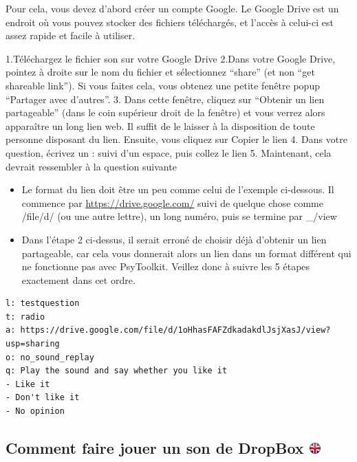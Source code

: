 \documentclass[
]{book}
\providecommand{\tightlist}{%
  \setlength{\itemsep}{0pt}\setlength{\parskip}{0pt}}
\begin{document}
Pour cela, vous devez d'abord créer un compte Google. Le Google Drive est un endroit où vous pouvez stocker des fichiers téléchargés, et l'accès à celui-ci est assez rapide et facile à utiliser.

1.Téléchargez le fichier son sur votre Google Drive
2.Dans votre Google Drive, pointez à droite sur le nom du fichier et sélectionnez ``share'' (et non ``get shareable link''). Si vous faites cela, vous obtenez une petite fenêtre popup ``Partager avec d'autres''.
3. Dans cette fenêtre, cliquez sur ``Obtenir un lien partageable'' (dans le coin supérieur droit de la fenêtre) et vous verrez alors apparaître un long lien web. Il suffit de le laisser à la disposition de toute personne disposant du lien. Ensuite, vous cliquez sur Copier le lien
4. Dans votre question, écrivez un : suivi d'un espace, puis collez le lien
5. Maintenant, cela devrait ressembler à la question suivante

\begin{itemize}
\tightlist
\item
  Le format du lien doit être un peu comme celui de l'exemple ci-dessous. Il commence par \url{https://drive.google.com/} suivi de quelque chose comme /file/d/ (ou une autre lettre), un long numéro, puis se termine par \_/view
\item
  Dans l'étape 2 ci-dessus, il serait erroné de choisir déjà d'obtenir un lien partageable, car cela vous donnerait alors un lien dans un format différent qui ne fonctionne pas avec PsyToolkit. Veillez donc à suivre les 5 étapes exactement dans cet ordre.
\end{itemize}

\begin{verbatim}
l: testquestion
t: radio
a: https://drive.google.com/file/d/1oHhasFAFZdkadakdlJsjXasJ/view?usp=sharing
o: no_sound_replay
q: Play the sound and say whether you like it
- Like it
- Don't like it
- No opinion
\end{verbatim}

\hypertarget{comment-faire-jouer-un-son-de-dropbox}{%
\subsection[Comment faire jouer un son de DropBox ]{\texorpdfstring{Comment faire jouer un son de DropBox \href{https://www.psytoolkit.org/lessons/surveyaudiovideo.html\#_how_to_play_a_sound_from_dropbox}{\protect\includegraphics{img/ukflag.png}}}{Comment faire jouer un son de DropBox }}\label{comment-faire-jouer-un-son-de-dropbox}}
\end{document}
